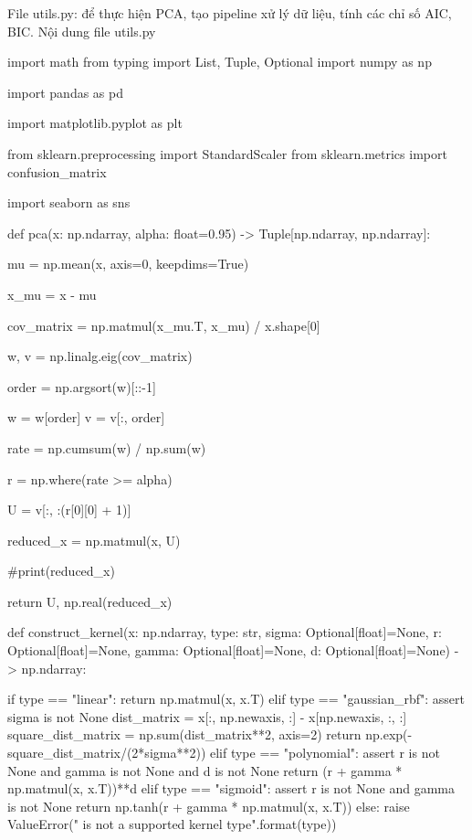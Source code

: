 File utils.py: để thực hiện PCA, tạo pipeline xử lý dữ liệu, tính các chỉ số AIC, BIC.
Nội dung file utils.py

\begin{python}
import math
from typing import List, Tuple, Optional
import numpy as np

import pandas as pd

import matplotlib.pyplot as plt

from sklearn.preprocessing import StandardScaler
from sklearn.metrics import confusion_matrix

import seaborn as sns



def pca(x: np.ndarray, alpha: float=0.95) -> Tuple[np.ndarray, np.ndarray]:
    
    mu = np.mean(x, axis=0, keepdims=True)

    x_mu = x - mu

    cov_matrix = np.matmul(x_mu.T, x_mu) / x.shape[0]

    w, v = np.linalg.eig(cov_matrix)

    order = np.argsort(w)[::-1]

    w = w[order]
    v = v[:, order]

    rate = np.cumsum(w) / np.sum(w)

    r = np.where(rate >= alpha)

    U = v[:, :(r[0][0] + 1)]

    reduced_x = np.matmul(x, U)

    #print(reduced_x)

    return U, np.real(reduced_x)


def construct_kernel(x: np.ndarray, type: str, sigma: Optional[float]=None, r: Optional[float]=None, gamma: Optional[float]=None, d: Optional[float]=None) -> np.ndarray:

    if type == "linear":
        return np.matmul(x, x.T)
    elif type == "gaussian_rbf":
        assert sigma is not None
        dist_matrix = x[:, np.newaxis, :] - x[np.newaxis, :, :]
        square_dist_matrix = np.sum(dist_matrix**2, axis=2)
        return np.exp(-square_dist_matrix/(2*sigma**2))
    elif type == "polynomial":
        assert r is not None and gamma is not None and d is not None
        return (r + gamma * np.matmul(x, x.T))**d
    elif type == "sigmoid":
        assert r is not None and gamma is not None
        return np.tanh(r + gamma * np.matmul(x, x.T))
    else:
        raise ValueError("{} is not a supported kernel type".format(type))
    

\end{python}

